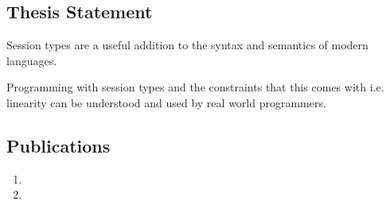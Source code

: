 


\subsection{Thesis Statement}
Session types are a useful addition to the syntax and semantics of modern languages.

Programming with session types and the constraints that this comes with i.e. linearity can be understood and used by real world programmers.

%

\subsection{Publications}
\begin{enumerate}
   \item {}
   \item {}
 \end{enumerate}
